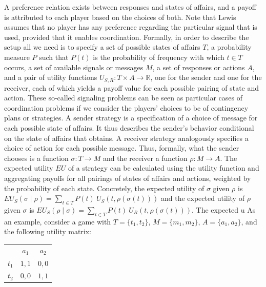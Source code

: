 \documentclass[a4paper]{article}
\begin{document}
A preference relation exists between responses and states of affairs, and a payoff is attributed to each player based on the choices of both.
Note that Lewis assumes that no player has any preference regarding the particular signal that is used, provided that it enables coordination.
Formally, in order to describe the setup all we need is to specify a set of possible states of affairs $T$, a probability measure $P$ such that $P(t)$ is the probability of frequency with which $t \in T$ occurs, a set of available signals or messages $M$, a set of responses or actions $A$, and a pair of utility functions $U_{S,R} : T \times A \rightarrow \mathbb{R}$, one for the sender and one for the receiver, each of which yields a payoff value for each possible pairing of state and action.
These so-called signaling problems can be seen as particular cases of coordination problems if we consider the players' choices to be of contingency plans or strategies.
A sender strategy is a specification of a choice of message for each possible state of affairs.
It thus describes the sender's behavior conditional on the state of affairs that obtains.
A receiver strategy analogously specifies a choice of action for each possible message.
Thus, formally, what the sender chooses is a function $\sigma : T \rightarrow M$ and the receiver a function $\rho : M \rightarrow A$.
The expected utility $EU$ of a strategy can be calculated using the utility function and aggregating payoffs for all pairings of states of affairs and actions, weighted by the probability of each state. Concretely, the expected utility of $\sigma$ given $\rho$ is $EU_S(\sigma \mid \rho) = \sum_{t \in T} P(t) \ U_S(t, \rho(\sigma(t)))$ and the expected utility of $\rho$ given $\sigma$ is $EU_S(\rho \mid \sigma) = \sum_{t \in T} P(t) \ U_R(t, \rho(\sigma(t)))$.
The expected u %
As an example, consider a game with $T = \lbrace t_1, t_2 \rbrace$, $M = \lbrace m_1, m_2 \rbrace$, $A = \lbrace a_1, a_2 \rbrace$, and the following utility matrix:
\begin{center}
\begin{tabular}{r|c|c|}
\multicolumn{1}{r}{}
 & \multicolumn{1}{c}{$a_1$}
 & \multicolumn{1}{c}{$a_2$} \\ \cline{2-3}
   $t_1$ & $1,1$ & $0,0$ \\ \cline{2-3}
   $t_2$ & $0,0$ & $1,1$ \\ \cline{2-3}
\end{tabular}
\end{center}
\end{document}

